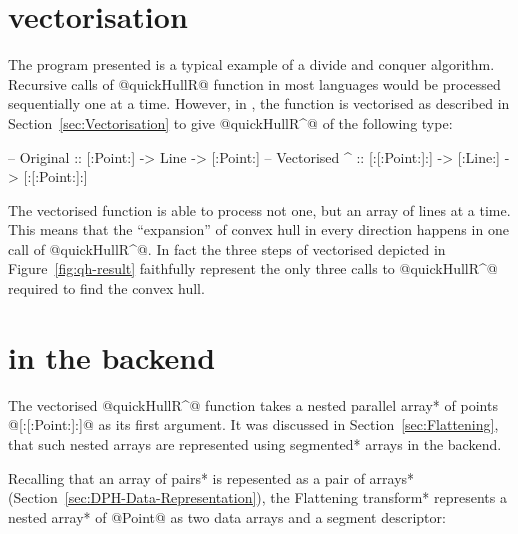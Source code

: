 \documentclass[preamble.tex]{subfiles}
\begin{document}
\section{\QuickHull vectorisation}

The \QuickHull program presented is a typical example of a divide and conquer algorithm. Recursive calls of @quickHullR@ function in most languages would be processed sequentially one at a time. However, in \DPH, the function is vectorised as described in Section~\ref{sec:Vectorisation} to give @quickHullR^@ of the following type:


\begin{hscode}[literate={^}{{$^\uparrow$}}1,]
-- Original
\QuickHullR  :: [:Point:] -> Line -> [:Point:]
-- Vectorised
\QuickHullR^ :: [:[:Point:]:] -> [:Line:] -> [:[:Point:]:]
\end{hscode}


The vectorised function is able to process not one, but an array of lines at a time. This means that the ``expansion'' of convex hull in every direction happens in one call of @quickHullR^@. In fact the three steps of vectorised \QuickHull depicted in Figure~\ref{fig:qh-result} faithfully represent the only three calls to @quickHullR^@ required to find the convex hull.



\section{\QuickHull in the backend}

The vectorised @quickHullR^@ function takes a \*nested parallel array* of points @[:[:Point:]:]@ as its first argument. It was discussed in Section~\ref{sec:Flattening}, that such nested arrays are represented using \*segmented* arrays in the backend.

Recalling that an \*array of pairs* is repesented as a \*pair of arrays* (Section~\ref{sec:DPH-Data-Representation}), the \*Flattening transform* represents a \*nested array* of @Point@ as two data arrays and a segment descriptor:


\newlength\fixedcharwidth
{}
\newcommand\seg[1]{\rule{#1\fixedcharwidth}{1pt}}

\end{document}
